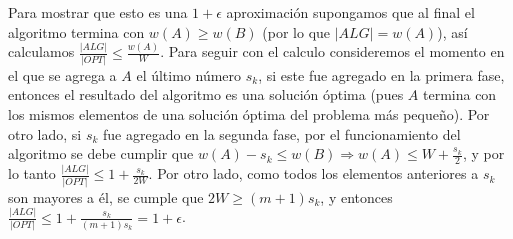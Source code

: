\documentclass[dcc,uchile]{fcfmcourse}
\theoremstyle{plain}
\theoremstyle{definition}
\begin{document}
\begin{problems}
\begin{itemize}
\end{itemize}
Para mostrar que esto es una $1+\epsilon$ aproximación supongamos que al final el algoritmo termina con $w(A) \ge w(B)$ (por lo que $|ALG| = w(A)$), así calculamos $\frac{|ALG|}{|OPT|}\le \frac{w(A)}{W}$. Para seguir con el calculo consideremos el momento en el que se agrega a $A$ el último número $s_{k}$, si este fue agregado en la primera fase, entonces el resultado del algoritmo es una solución óptima (pues $A$ termina con los mismos elementos de una solución óptima del problema más pequeño). Por otro lado, si $s_{k}$ fue agregado en la segunda fase, por el funcionamiento del algoritmo se debe cumplir que $w(A)-s_{k} \le w(B) \Rightarrow w(A) \le W + \frac{s_{k}}{2}$, y por lo tanto $\frac{|ALG|}{|OPT|} \le 1 + \frac{s_{k}}{2W}$. Por otro lado, como todos los elementos anteriores a $s_k$ son mayores a él, se cumple que $2W \ge (m+1)s_{k}$, y entonces $\frac{|ALG|}{|OPT|} \le 1 + \frac{s_{k}}{(m+1)s_{k}} = 1 + \epsilon$.
\end{problems}
\end{document}
